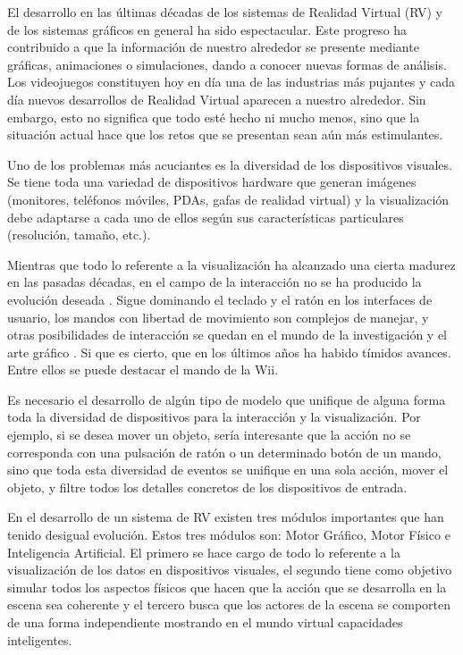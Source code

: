 \documentclass{egpubl}
\begin{document}
El desarrollo en las \'ultimas d\'ecadas de los sistemas de Realidad
Virtual (RV) y de los sistemas gr\'aficos en general ha sido
espectacular. Este progreso ha contribuido a que la informaci\'on de
nuestro alrededor se presente mediante gr\'aficas, animaciones o
simulaciones, dando a conocer nuevas formas de an\'alisis. Los
videojuegos constituyen hoy en d\'ia una de las industrias m\'as
pujantes y cada d\'ia nuevos desarrollos de Realidad Virtual aparecen a
nuestro alrededor. Sin embargo, esto no significa que todo est\'e hecho
ni mucho menos, sino que la situaci\'on actual hace que los retos que
se presentan sean a\'un m\'as estimulantes.

 Uno de los problemas m\'as acuciantes es la diversidad de los
dispositivos visuales. Se tiene toda una variedad de dispositivos hardware que
generan im\'agenes (monitores, tel\'efonos m\'oviles, PDAs, gafas de
realidad virtual) y la visualizaci\'on debe adaptarse a cada uno de
ellos seg\'un sus caracter\'isticas particulares (resoluci\'on,
tama\~no, etc.).

 Mientras que todo lo referente a la visualizaci\'on ha alcanzado una
cierta madurez en las pasadas d\'ecadas, en el campo de la
interacci\'on no se ha producido la evoluci\'on deseada \cite{Joshua2004,David2005}. Sigue
dominando el teclado y el rat\'on en los interfaces de usuario, los
mandos con libertad de movimiento son complejos de manejar, y otras
posibilidades de interacci\'on se quedan en el mundo de la
investigaci\'on y el arte gr\'afico \cite{Joshua2004}. Si que es cierto, que en los
\'ultimos a\~nos ha habido t\'imidos avances. Entre ellos se puede
destacar el mando de la Wii.

 Es necesario el desarrollo de alg\'un tipo de modelo que unifique de
alguna forma toda la diversidad de dispositivos para la interacci\'on y
la visualizaci\'on. Por ejemplo, si se desea mover un objeto, ser\'ia
interesante que la acci\'on no se corresponda con una pulsaci\'on de
rat\'on o un determinado bot\'on de un mando, sino que toda esta
diversidad de eventos se unifique en una sola acci\'on, mover el
objeto, y filtre todos los detalles concretos de los dispositivos de
entrada.

 En el desarrollo de un sistema de RV existen tres m\'odulos importantes
que han tenido desigual evoluci\'on. Estos tres m\'odulos son: Motor
Gr\'afico, Motor F\'isico e Inteligencia Artificial. El primero se hace
cargo de todo lo referente a la visualizaci\'on de los datos en
dispositivos visuales, el segundo tiene como objetivo simular todos los
aspectos f\'isicos que hacen que la acci\'on que se desarrolla en la
escena sea coherente y el tercero busca que los actores de la escena se
comporten de una forma independiente mostrando en el mundo virtual
capacidades inteligentes.
\end{document}
